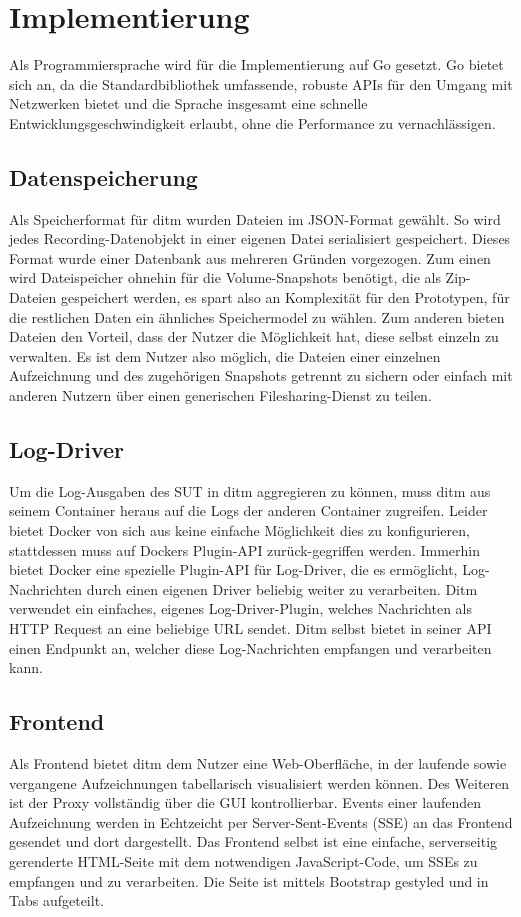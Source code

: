 \documentclass[12pt,a4paper]{report}
\begin{document}
\section{Implementierung}
Als Programmiersprache wird für die Implementierung auf Go gesetzt. Go bietet sich an, da die Standardbibliothek
umfassende, robuste APIs für den Umgang mit Netzwerken bietet und die Sprache insgesamt eine schnelle
Entwicklungsgeschwindigkeit erlaubt, ohne die Performance zu vernachlässigen.
\subsection{Datenspeicherung}
Als Speicherformat für ditm wurden Dateien im JSON-Format gewählt. So wird jedes Recording-Datenobjekt in
einer eigenen Datei serialisiert gespeichert. Dieses Format wurde einer Datenbank aus mehreren Gründen vorgezogen.
Zum einen wird Dateispeicher ohnehin für die Volume-Snapshots benötigt, die als Zip-Dateien gespeichert werden,
es spart also an Komplexität für den Prototypen, für die restlichen Daten ein ähnliches Speichermodel zu wählen.
Zum anderen bieten Dateien den Vorteil, dass der Nutzer die Möglichkeit hat, diese selbst einzeln zu verwalten.
Es ist dem Nutzer also möglich, die Dateien einer einzelnen Aufzeichnung und des zugehörigen Snapshots getrennt
zu sichern oder einfach mit anderen Nutzern über einen generischen Filesharing-Dienst zu teilen.
\subsection{Log-Driver}
Um die Log-Ausgaben des SUT in ditm aggregieren zu können, muss ditm aus seinem Container heraus auf die Logs der
anderen Container zugreifen. Leider bietet Docker von sich aus keine einfache Möglichkeit dies zu konfigurieren,
stattdessen muss auf Dockers Plugin-API zurück-gegriffen werden. Immerhin bietet Docker eine spezielle Plugin-API
für Log-Driver, die es ermöglicht, Log-Nachrichten durch einen eigenen Driver beliebig weiter zu verarbeiten.
Ditm verwendet ein einfaches, eigenes Log-Driver-Plugin, welches Nachrichten als HTTP Request an eine beliebige URL
sendet. Ditm selbst bietet in seiner API einen Endpunkt an, welcher diese Log-Nachrichten empfangen und verarbeiten kann.
\subsection{Frontend}
Als Frontend bietet ditm dem Nutzer eine Web-Oberfläche, in der laufende sowie vergangene Aufzeichnungen tabellarisch visualisiert
werden können. Des Weiteren ist der Proxy vollständig über die GUI kontrollierbar. Events einer laufenden Aufzeichnung werden in
Echtzeicht per Server-Sent-Events (SSE) an das Frontend gesendet und dort dargestellt. Das Frontend selbst ist eine einfache,
serverseitig gerenderte HTML-Seite mit dem notwendigen JavaScript-Code, um SSEs zu empfangen und zu verarbeiten. Die Seite ist
mittels Bootstrap gestyled und in Tabs aufgeteilt.
\end{document}
